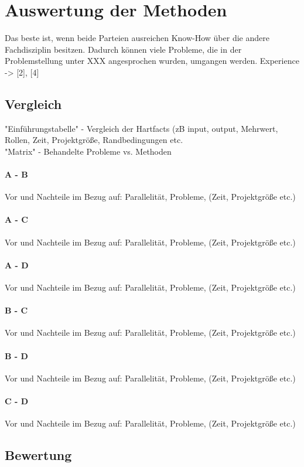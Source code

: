 \section{Auswertung der Methoden}

Das beste ist, wenn beide Parteien ausreichen Know-How über die andere Fachdisziplin besitzen. Dadurch können viele Probleme, die in der Problemstellung unter XXX angesprochen wurden, umgangen werden. 
Experience -> [2], [4]

\subsection{Vergleich}

"Einführungstabelle" - Vergleich der Hartfacts (zB input, output, Mehrwert, Rollen, Zeit, Projektgröße, Randbedingungen etc. \\


"Matrix" - Behandelte Probleme vs. Methoden \\


\paragraph{A - B}
Vor und Nachteile im Bezug auf: Parallelität, Probleme, (Zeit, Projektgröße etc.)\\

\paragraph{A - C}
Vor und Nachteile im Bezug auf: Parallelität, Probleme, (Zeit, Projektgröße etc.)\\

\paragraph{A - D}
Vor und Nachteile im Bezug auf: Parallelität, Probleme, (Zeit, Projektgröße etc.)\\

\paragraph{B - C}
Vor und Nachteile im Bezug auf: Parallelität, Probleme, (Zeit, Projektgröße etc.)\\

\paragraph{B - D}
Vor und Nachteile im Bezug auf: Parallelität, Probleme, (Zeit, Projektgröße etc.)\\

\paragraph{C - D}
Vor und Nachteile im Bezug auf: Parallelität, Probleme, (Zeit, Projektgröße etc.)\\


\subsection{Bewertung}